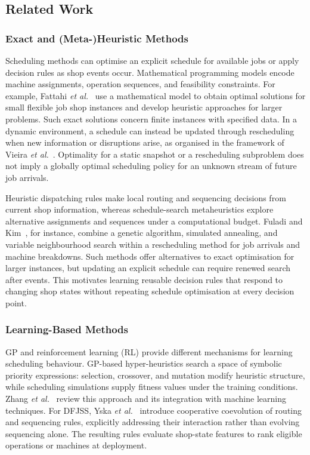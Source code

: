 \documentclass[10pt,journal]{IEEEtran}
\begin{document}
\subsection{Related Work}
\subsubsection{Exact and (Meta-)Heuristic Methods}
Scheduling methods can optimise an explicit schedule for available jobs or apply decision rules as shop events occur. Mathematical programming models encode machine assignments, operation sequences, and feasibility constraints. For example, Fattahi \emph{et al.}~\cite{fattahi2007mathematical} use a mathematical model to obtain optimal solutions for small flexible job shop instances and develop heuristic approaches for larger problems. Such exact solutions concern finite instances with specified data. In a dynamic environment, a schedule can instead be updated through rescheduling when new information or disruptions arise, as organised in the framework of Vieira \emph{et al.}~\cite{vieira2003rescheduling}. Optimality for a static snapshot or a rescheduling subproblem does not imply a globally optimal scheduling policy for an unknown stream of future job arrivals.

Heuristic dispatching rules make local routing and sequencing decisions from current shop information, whereas schedule-search metaheuristics explore alternative assignments and sequences under a computational budget. Fuladi and Kim~\cite{fuladi2024dynamic}, for instance, combine a genetic algorithm, simulated annealing, and variable neighbourhood search within a rescheduling method for job arrivals and machine breakdowns. Such methods offer alternatives to exact optimisation for larger instances, but updating an explicit schedule can require renewed search after events. This motivates learning reusable decision rules that respond to changing shop states without repeating schedule optimisation at every decision point.

\subsubsection{Learning-Based Methods}
GP and reinforcement learning (RL) provide different mechanisms for learning scheduling behaviour. GP-based hyper-heuristics search a space of symbolic priority expressions: selection, crossover, and mutation modify heuristic structure, while scheduling simulations supply fitness values under the training conditions. Zhang \emph{et al.}~\cite{zhang2024survey} review this approach and its integration with machine learning techniques. For DFJSS, Yska \emph{et al.}~\cite{yska2018coevolution} introduce cooperative coevolution of routing and sequencing rules, explicitly addressing their interaction rather than evolving sequencing alone. The resulting rules evaluate shop-state features to rank eligible operations or machines at deployment.
\end{document}
